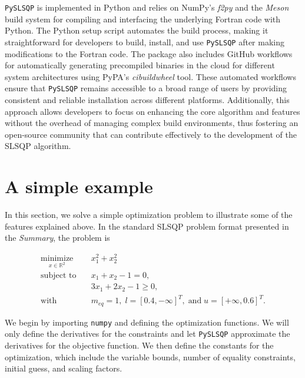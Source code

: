\documentclass[
]{article}
\begin{document}
\texttt{PySLSQP} is implemented in Python and relies on NumPy's
\emph{f2py} and the \emph{Meson} build system for compiling and
interfacing the underlying Fortran code with Python. The Python setup
script automates the build process, making it straightforward for
developers to build, install, and use \texttt{PySLSQP} after making
modifications to the Fortran code. The package also includes GitHub
workflows for automatically generating precompiled binaries in the cloud
for different system architectures using PyPA's \emph{cibuildwheel}
tool. These automated workflows ensure that \texttt{PySLSQP} remains
accessible to a broad range of users by providing consistent and
reliable installation across different platforms. Additionally, this
approach allows developers to focus on enhancing the core algorithm and
features without the overhead of managing complex build environments,
thus fostering an open-source community that can contribute effectively
to the development of the SLSQP algorithm.

\section{A simple example}\label{a-simple-example}

In this section, we solve a simple optimization problem to illustrate
some of the features explained above. In the standard SLSQP problem
format presented in the \emph{Summary}, the problem is

\begin{align*}
\underset{x \in \mathbb{R}^2}{\text{minimize}} \quad & x_1^2 + x_2^2\\
\text{subject to} \quad & x_1 + x_2 - 1 = 0, \\
& 3x_1 + 2x_2 - 1 \geq 0,  \\
\text{with} \quad & m_{eq} = 1, \; l = [0.4, -\infty]^T, \; \text{and} \; u = [+\infty, 0.6]^T.
\end{align*}

We begin by importing \texttt{numpy} and defining the optimization
functions. We will only define the derivatives for the constraints and
let \texttt{PySLSQP} approximate the derivatives for the objective
function. We then define the constants for the optimization, which
include the variable bounds, number of equality constraints, initial
guess, and scaling factors.
\end{document}
